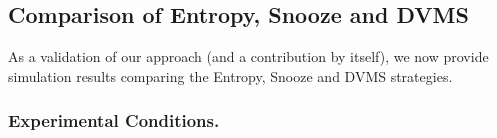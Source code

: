 \subsection{Comparison of Entropy, Snooze and DVMS}
\label{subsec:first-usecase}


As a validation of our approach (and a contribution by itself), we now
provide simulation results comparing the Entropy, Snooze and DVMS
strategies.

\subsubsection{Experimental Conditions.}


